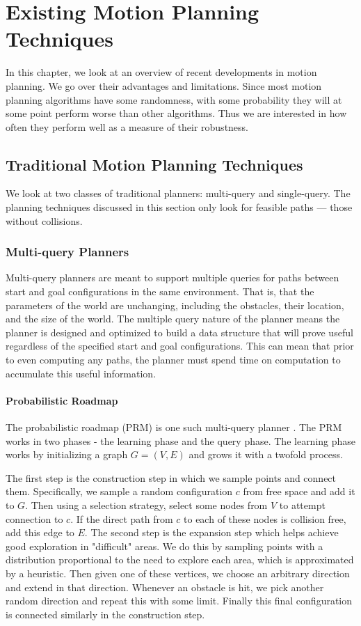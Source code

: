 \chapter{Existing Motion Planning Techniques}
In this chapter, we look at an overview of recent developments in motion planning. We go over their advantages and limitations. Since most motion planning algorithms have some randomness, with some probability they will at some point perform worse than other algorithms. Thus we are interested in how often they perform well as a measure of their robustness.

\section{Traditional Motion Planning Techniques} \label{planning:techniques}
We look at two classes of traditional planners: multi-query and single-query. The planning techniques discussed in this section only look for feasible paths --- those without collisions.

\subsection{Multi-query Planners}
Multi-query planners are meant to support multiple queries for paths between start and goal configurations in the same environment. That is, that the parameters of the world are unchanging, including the obstacles, their location, and the size of the world. The multiple query nature of the planner means the planner is designed and optimized to build a data structure that will prove useful regardless of the specified start and goal configurations. This can mean that prior to even computing any paths, the planner must spend time on computation to accumulate this useful information.

\subsubsection{Probabilistic Roadmap}
The probabilistic roadmap (PRM) is one such multi-query planner \cite{kavraki:prm}. The PRM works in two phases - the learning phase and the query phase. The learning phase works by initializing a graph $G=(V,E)$ and grows it with a twofold process. 

The first step is the construction step in which we sample points and connect them. Specifically, we sample a random configuration $c$ from free space and add it to $G$. Then using a selection strategy, select some nodes from $V$ to attempt connection to $c$. If the direct path from $c$ to each of these nodes is collision free, add this edge to $E$. The second step is the expansion step which helps achieve good exploration in "difficult" areas. We do this by sampling points with a distribution proportional to the need to explore each area, which is approximated by a heuristic. Then given one of these vertices, we choose an arbitrary direction and extend in that direction. Whenever an obstacle is hit, we pick another random direction and repeat this with some limit. Finally this final configuration is connected similarly in the construction step. 

